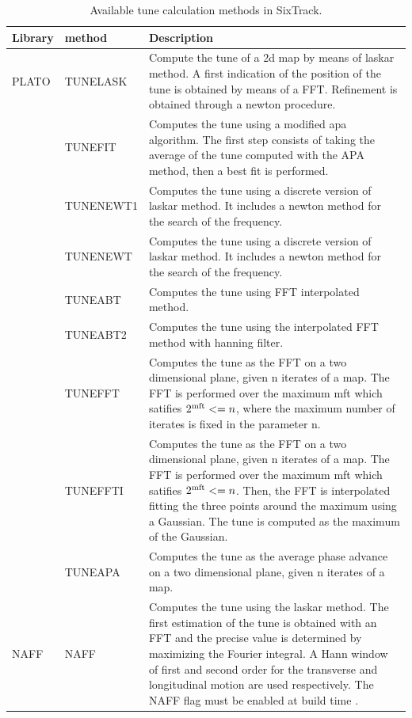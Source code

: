 \begin{table}[H]
	\begin{center}
		\caption{Available tune calculation methods in SixTrack.}
		\label{fma:tab:1}
		\begin{tabularx}{\textwidth}{|l|l|X|}
			\hline
\textbf{Library} & \textbf{method} & \textbf{Description} \\\hline
PLATO \cite{plato1,plato2}
& TUNELASK &	Compute the tune of a 2d map by means of laskar method. A first indication of the position of the tune is obtained by means of a FFT. Refinement is obtained through a newton procedure.\\\cline{2-3}
& TUNEFIT &	Computes the tune using a modified apa algorithm. The first step consists of taking the average of the tune computed with the APA method, then a best fit is performed.\\\cline{2-3}
& TUNENEWT1 &	Computes the tune using a discrete version of laskar method. It includes a newton method for the search of the frequency.\\\cline{2-3}
& TUNENEWT &	Computes the tune using a discrete version of laskar method. It includes a newton method for the search of the frequency.\\\cline{2-3}
& TUNEABT &	Computes the tune using FFT interpolated method.\\\cline{2-3}
& TUNEABT2 &	Computes the tune using the interpolated FFT method with hanning filter.\\\cline{2-3}
& TUNEFFT &	Computes the tune as the FFT on a two dimensional plane, given n iterates of a map. The FFT is performed over the maximum mft which satifies $2^{\rm mft} <= n$, where the maximum number of iterates is fixed in the parameter n.\\\cline{2-3}
& TUNEFFTI &	Computes the tune as the FFT on a two dimensional plane, given n iterates of a map. The FFT is performed over the maximum mft which satifies $2^{\rm mft} <= n$. Then, the FFT is interpolated fitting the three points around the maximum using a Gaussian. The tune is computed as the maximum of the Gaussian.\\\cline{2-3}
& TUNEAPA &	Computes the tune as the average phase advance on a two dimensional plane, given n iterates of a map. \\\hline
NAFF \cite{NAFFpaper, NAFFpaper2}
& NAFF &	Computes the tune using the laskar method. The first estimation of the tune is obtained with an FFT and the precise value is determined by maximizing the Fourier integral. A Hann window of first and second order for the transverse and longitudinal motion are used respectively. The NAFF flag must be enabled at build time \cite{sixbuild}. \\\hline
	\end{tabularx}
\end{center}
\end{table}

